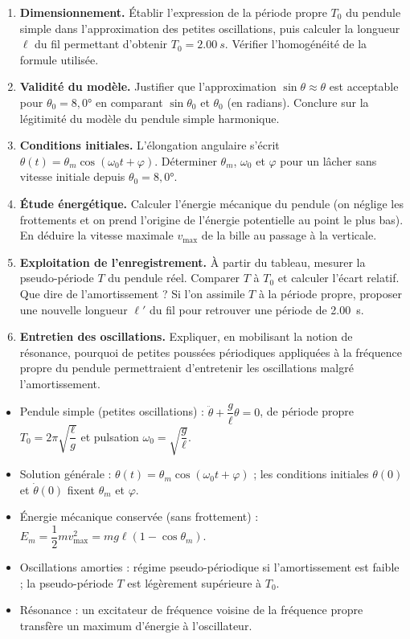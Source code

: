 \documentclass[11pt]{article}
\newcounter{popsec}
\newcounter{popsub}
\newcommand{\courssub}[1]{%
  \stepcounter{popsub}%
  \par\vspace{9pt}\noindent{\popxbold\fontsize{11.5}{13}\selectfont\color{popink}{\color{poporange}\thepopsec.\thepopsub}\hspace{6pt}#1}\par\nopagebreak\vspace{4pt}
}
\begin{document}
\begin{enumerate}
\item \textbf{Dimensionnement.} Établir l'expression de la période propre $T_0$ du pendule simple dans l'approximation des petites oscillations, puis calculer la longueur $\ell$ du fil permettant d'obtenir $T_0 = \SI{2,00}{s}$. Vérifier l'homogénéité de la formule utilisée.
\item \textbf{Validité du modèle.} Justifier que l'approximation $\sin\theta \approx \theta$ est acceptable pour $\theta_0 = 8,0°$ en comparant $\sin\theta_0$ et $\theta_0$ (en radians). Conclure sur la légitimité du modèle du pendule simple harmonique.
\item \textbf{Conditions initiales.} L'élongation angulaire s'écrit $\theta(t) = \theta_m\cos(\omega_0 t + \varphi)$. Déterminer $\theta_m$, $\omega_0$ et $\varphi$ pour un lâcher sans vitesse initiale depuis $\theta_0 = 8,0°$.
\item \textbf{Étude énergétique.} Calculer l'énergie mécanique du pendule (on néglige les frottements et on prend l'origine de l'énergie potentielle au point le plus bas). En déduire la vitesse maximale $v_{\max}$ de la bille au passage à la verticale.
\item \textbf{Exploitation de l'enregistrement.} À partir du tableau, mesurer la pseudo-période $T$ du pendule réel. Comparer $T$ à $T_0$ et calculer l'écart relatif. Que dire de l'amortissement ? Si l'on assimile $T$ à la période propre, proposer une nouvelle longueur $\ell'$ du fil pour retrouver une période de \SI{2,00}{s}.
\item \textbf{Entretien des oscillations.} Expliquer, en mobilisant la notion de résonance, pourquoi de petites poussées périodiques appliquées à la fréquence propre du pendule permettraient d'entretenir les oscillations malgré l'amortissement.
\end{enumerate}

\courssub{Ressources à mobiliser}

\begin{aretenir}
\begin{itemize}
\item Pendule simple (petites oscillations) : $\ddot{\theta} + \dfrac{g}{\ell}\theta = 0$, de période propre $T_0 = 2\pi\sqrt{\dfrac{\ell}{g}}$ et pulsation $\omega_0 = \sqrt{\dfrac{g}{\ell}}$.
\item Solution générale : $\theta(t) = \theta_m\cos(\omega_0 t + \varphi)$ ; les conditions initiales $\theta(0)$ et $\dot{\theta}(0)$ fixent $\theta_m$ et $\varphi$.
\item Énergie mécanique conservée (sans frottement) : $E_m = \dfrac{1}{2}mv_{\max}^2 = mg\ell(1-\cos\theta_m)$.
\item Oscillations amorties : régime pseudo-périodique si l'amortissement est faible ; la pseudo-période $T$ est légèrement supérieure à $T_0$.
\item Résonance : un excitateur de fréquence voisine de la fréquence propre transfère un maximum d'énergie à l'oscillateur.
\end{itemize}
\end{aretenir}
\end{document}
